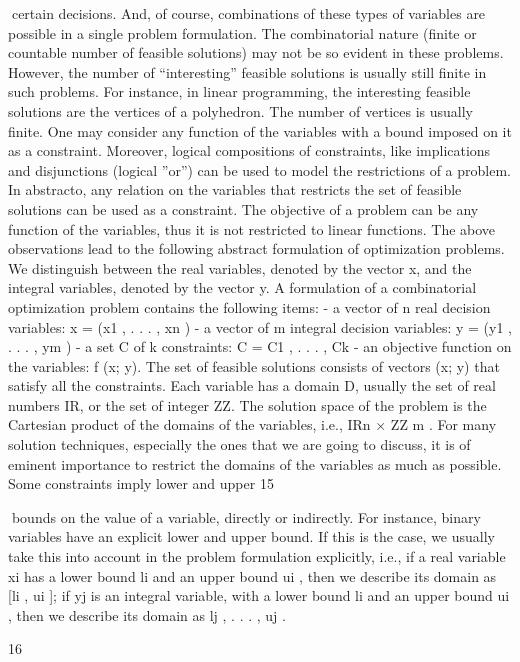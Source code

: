 \documentclass[titlepage]{book}
\begin{document}
certain decisions. And, of course, combinations of these types of variables are possible in a single problem
formulation. The combinatorial nature (finite or countable number of feasible solutions) may not be so
evident in these problems. However, the number of “interesting” feasible solutions is usually still finite
in such problems. For instance, in linear programming, the interesting feasible solutions are the vertices
of a polyhedron. The number of vertices is usually finite.
One may consider any function of the variables with a bound imposed on it as a constraint. Moreover,
logical compositions of constraints, like implications and disjunctions (logical ”or”) can be used to model
the restrictions of a problem. In abstracto, any relation on the variables that restricts the set of feasible
solutions can be used as a constraint.
The objective of a problem can be any function of the variables, thus it is not restricted to linear functions.
The above observations lead to the following abstract formulation of optimization problems. We distinguish between the real variables, denoted by the vector x, and the integral variables, denoted by the
vector y. A formulation of a combinatorial optimization problem contains the following items:
- a vector of n real decision variables:
x = (x1 , . . . , xn )
- a vector of m integral decision variables:
y = (y1 , . . . , ym )
- a set C of k constraints:
C = {C1 , . . . , Ck }
- an objective function on the variables:
f (x; y).
The set of feasible solutions consists of vectors (x; y) that satisfy all the constraints. Each variable has a
domain D, usually the set of real numbers IR, or the set of integer ZZ. The solution space of the problem
is the Cartesian product of the domains of the variables, i.e., IRn × ZZ m .
For many solution techniques, especially the ones that we are going to discuss, it is of eminent importance
to restrict the domains of the variables as much as possible. Some constraints imply lower and upper
15

bounds on the value of a variable, directly or indirectly. For instance, binary variables have an explicit
lower and upper bound. If this is the case, we usually take this into account in the problem formulation
explicitly, i.e., if a real variable xi has a lower bound li and an upper bound ui , then we describe its
domain as [li , ui ]; if yj is an integral variable, with a lower bound li and an upper bound ui , then we
describe its domain as {lj , . . . , uj }.

16
\end{document}
